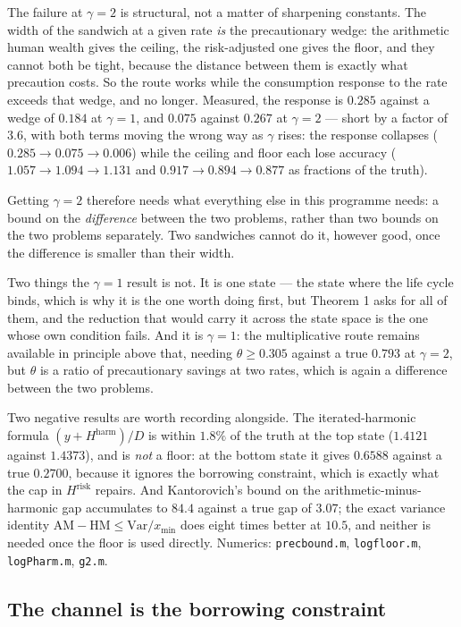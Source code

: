 The failure at $\gamma=2$ is structural, not a matter of sharpening constants. The width of the
sandwich at a given rate \emph{is} the precautionary wedge: the arithmetic human wealth gives the
ceiling, the risk-adjusted one gives the floor, and they cannot both be tight, because the distance
between them is exactly what precaution costs. So the route works while the consumption response to
the rate exceeds that wedge, and no longer. Measured, the response is $0.285$ against a wedge of
$0.184$ at $\gamma=1$, and $0.075$ against $0.267$ at $\gamma=2$ --- short by a factor of $3.6$, with
both terms moving the wrong way as $\gamma$ rises: the response collapses ($0.285\to0.075\to0.006$)
while the ceiling and floor each lose accuracy ($1.057\to1.094\to1.131$ and
$0.917\to0.894\to0.877$ as fractions of the truth).

Getting $\gamma=2$ therefore needs what everything else in this programme needs: a bound on the
\emph{difference} between the two problems, rather than two bounds on the two problems separately. Two
sandwiches cannot do it, however good, once the difference is smaller than their width.

Two things the $\gamma=1$ result is not. It is one state --- the state where the life cycle binds,
which is why it is the one worth doing first, but Theorem 1 asks for all of them, and the reduction
that would carry it across the state space is the one whose own condition fails. And it is
$\gamma=1$: the multiplicative route remains available in principle above that, needing
$\theta\ge0.305$ against a true $0.793$ at $\gamma=2$, but $\theta$ is a ratio of precautionary
savings at two rates, which is again a difference between the two problems.

Two negative results are worth recording alongside. The iterated-harmonic formula
$(y+H^{\mathrm{harm}})/D$ is within $1.8\%$ of the truth at the top state ($1.4121$ against
$1.4373$), and is \emph{not} a floor: at the bottom state it gives $0.6588$ against a true $0.2700$,
because it ignores the borrowing constraint, which is exactly what the cap in $H^{\mathrm{risk}}$
repairs. And Kantorovich's bound on the arithmetic-minus-harmonic gap accumulates to $84.4$ against a
true gap of $3.07$; the exact variance identity $\mathrm{AM}-\mathrm{HM}\le\mathrm{Var}/x_{\min}$
does eight times better at $10.5$, and neither is needed once the floor is used directly. Numerics:
\texttt{precbound.m}, \texttt{logfloor.m}, \texttt{logPharm.m}, \texttt{g2.m}.

\subsection{The channel is the borrowing constraint}

